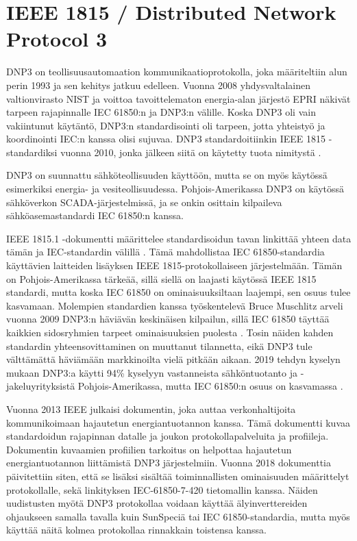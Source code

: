 \section{IEEE 1815 / Distributed Network Protocol 3}
  DNP3 on teollisuusautomaation kommunikaatioprotokolla, joka määriteltiin alun perin 1993 ja sen kehitys jatkuu edelleen. Vuonna 2008 yhdysvaltalainen valtionvirasto NIST ja voittoa tavoittelematon energia-alan järjestö \gls{EPRI} näkivät tarpeen rajapinnalle \gls{IEC} 61850:n ja DNP3:n välille. Koska DNP3 oli vain vakiintunut käytäntö, DNP3:n standardisointi oli tarpeen, jotta yhteistyö ja koordinointi \gls{IEC}:n kanssa olisi sujuvaa. DNP3 standardoitiinkin \gls{IEEE} 1815 -standardiksi vuonna 2010, jonka jälkeen siitä on käytetty tuota nimitystä \parencite{DNP3&61850}.

  DNP3 on suunnattu sähköteollisuuden käyttöön, mutta se on myös käytössä esimerkiksi energia- ja vesiteollisuudessa. Pohjois-Amerikassa DNP3 on käytössä sähköverkon \gls{SCADA}-järjestelmissä, ja se onkin osittain kilpaileva sähköasemastandardi IEC 61850:n kanssa.

  IEEE 1815.1 -dokumentti määrittelee standardisoidun tavan linkittää yhteen data tämän ja IEC-standardin välillä \parencite{IEEE1815.1}. Tämä mahdollistaa IEC 61850-standardia käyttävien laitteiden lisäyksen IEEE 1815-protokollaiseen järjestelmään. Tämän on Pohjois-Amerikassa tärkeää, sillä siellä on laajasti käytössä IEEE 1815 standardi, mutta koska IEC 61850 on ominaisuuksiltaan laajempi, sen osuus tulee kasvamaan. Molempien standardien kanssa työskentelevä Bruce Muschlitz arveli vuonna 2009 DNP3:n häviävän keskinäisen kilpailun, sillä IEC 61850 täyttää kaikkien sidosryhmien tarpeet ominaisuuksien puolesta \parencite{DNPvsIEC}. Tosin näiden kahden standardin yhteensovittaminen on muuttanut tilannetta, eikä DNP3 tule välttämättä häviämään markkinoilta vielä pitkään aikaan. 2019 tehdyn kyselyn mukaan DNP3:a käytti 94\% kyselyyn vastanneista sähköntuotanto ja -jakeluyrityksistä Pohjois-Amerikassa, mutta IEC 61850:n osuus on kasvamassa \parencite{DNP3Study}.

  Vuonna 2013 IEEE julkaisi dokumentin, joka auttaa verkonhaltijoita kommunikoimaan hajautetun energiantuotannon kanssa. Tämä dokumentti kuvaa standardoidun rajapinnan datalle ja joukon protokollapalveluita ja profiileja. Dokumentin kuvaamien profiilien tarkoitus on helpottaa hajautetun energiantuotannon liittämistä DNP3 järjestelmiin. Vuonna 2018 dokumenttia päivitettiin siten, että se lisäksi sisältää toiminnallisten ominaisuuden määrittelyt protokollalle, sekä linkityksen IEC-61850-7-420 tietomallin kanssa. Näiden uudistusten myötä DNP3 protokollaa voidaan käyttää älyinverttereiden ohjaukseen samalla tavalla kuin SunSpeciä tai IEC 61850-standardia, mutta myös käyttää näitä kolmea protokollaa rinnakkain toistensa kanssa. \parencite{DNP3Inv, DNP3AppNote}

